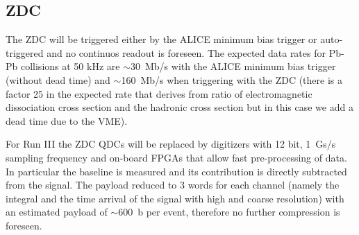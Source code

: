 \subsection{ZDC}
\label{ZDC:datarate}

The ZDC will be triggered either by the ALICE minimum bias trigger or auto-triggered and no continuos readout is foreseen.
The expected data rates for Pb-Pb collisions at 50 kHz are $\sim$30~Mb/s with the ALICE minimum bias trigger (without dead time) and $\sim$160~Mb/s when triggering with the ZDC (there is a factor 25 in the expected rate that derives from ratio of electromagnetic dissociation cross section and the hadronic cross section but in this case we add a dead time due to the VME).

For Run III the ZDC QDCs will be replaced by digitizers with 12 bit, 1~Gs/s sampling frequency and on-board FPGAs that allow fast pre-processing of data. In particular the baseline is measured and its contribution is directly subtracted from the signal. The payload reduced to 3 words for each channel (namely the integral and the time arrival of the signal with high and coarse resolution) with an estimated payload 
of $\sim$600~b per event, therefore no further compression is foreseen. 
